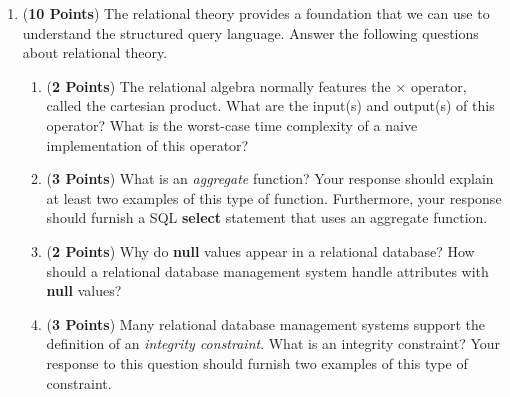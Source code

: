 \documentclass[12pt]{article}
\begin{document}
\begin{enumerate}
\newpage

\item ({\bf 10 Points}) The relational theory provides a foundation
  that we can use to understand the structured query language.  Answer
  the following questions about relational theory.

\begin{enumerate}



\item ({\bf 2 Points}) The relational algebra normally features the
  $\times$ operator, called the cartesian product.  What are the
  input(s) and output(s) of this operator?  What is the worst-case time
  complexity of a naive implementation of this operator?



\item ({\bf 3 Points}) What is an {\em aggregate} function?  Your
  response should explain at least two examples of this type of
  function.  Furthermore, your response should furnish a SQL {\bf
    select} statement that uses an aggregate function.

\item ({\bf 2 Points}) Why do {\bf null} values appear in a relational
  database? How should a relational database management system handle
  attributes with {\bf null} values?  

\item ({\bf 3 Points}) Many relational database management systems
  support the definition of an {\em integrity constraint}.  What is an
  integrity constraint?  Your response to this question should furnish
  two examples of this type of constraint.


\end{enumerate}
\end{enumerate}
\end{document}
